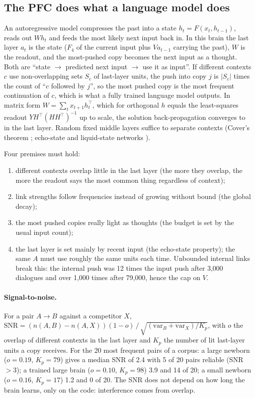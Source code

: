 \documentclass[11pt]{article}
\begin{document}
\subsection{The PFC does what a language model does}\label{sec:equiv}
An autoregressive model compresses the past into a state $h_t=F(x_t,h_{t-1})$, reads out $Wh_t$ and feeds the most likely
next input back in. In this brain the last layer $a_t$ is the state ($F_4$ of the current input plus $V a_{t-1}$ carrying
the past), $W$ is the readout, and the most-pushed copy becomes the next input as a thought. Both are ``state
$\to$ predicted next input $\to$ use it as input''. If different contexts $c$ use non-overlapping sets $S_c$ of last-layer
units, the push into copy $j$ is $|S_c|$ times the count of ``$c$ followed by $j$'', so the most pushed copy is the most
frequent continuation of $c$, which is what a fully trained language model outputs. In matrix form
$W=\sum_t x_{t+1}h_t^\top$, which for orthogonal $h$ equals the least-squares readout $YH^\top(HH^\top)^{-1}$ up to scale,
the solution back-propagation converges to in the last layer. Random fixed middle layers suffice to separate contexts
(Cover's theorem \cite{cover_1965}; echo-state and liquid-state networks \cite{jaeger_2001,maass_2002}).

Four premises must hold:
\begin{enumerate}
\item different contexts overlap little in the last layer (the more they overlap, the more the readout says the most
common thing regardless of context);
\item link strengths follow frequencies instead of growing without bound (the global decay);
\item the most pushed copies really light as thoughts (the budget is set by the usual input count);
\item the last layer is set mainly by recent input (the echo-state property); the same $A$ must use roughly the same units
each time. Unbounded internal links break this: the internal push was 12 times the input push after 3,000 dialogues and
over 1,000 times after 79,000, hence the cap on $V$.
\end{enumerate}

\paragraph{Signal-to-noise.} For a pair $A\to B$ against a competitor $X$,
$\text{SNR} = (n(A,B)-n(A,X))(1-o)\,/\,\sqrt{(\text{var}_B+\text{var}_X)/K_p}$, with $o$ the overlap of different contexts in
the last layer and $K_p$ the number of lit last-layer units a copy receives. For the 20 most frequent pairs of a corpus:
a large newborn ($o=0.19$, $K_p=79$) gives a median SNR of 2.4 with 5 of 20 pairs reliable (SNR $>3$); a trained large brain
($o=0.10$, $K_p=98$) 3.9 and 14 of 20; a small newborn ($o=0.16$, $K_p=17$) 1.2 and 0 of 20. The SNR does not depend on how
long the brain learns, only on the code: interference comes from overlap.
\end{document}
